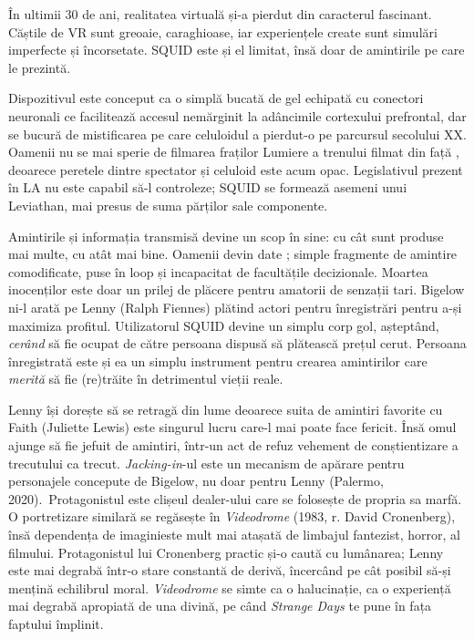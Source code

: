 \documentclass[12pt]{article}
\begin{document}
	În ultimii 30 de ani, realitatea virtuală și-a pierdut din caracterul fascinant. Căștile de VR sunt greoaie, caraghioase, iar experiențele create sunt simulări imperfecte și încorsetate. SQUID este și el limitat, însă doar de amintirile pe care le prezintă.\par
	
	Dispozitivul este conceput ca o simplă bucată de gel echipată cu conectori neuronali ce facilitează accesul nemărginit la adâncimile cortexului prefrontal, dar se bucură de mistificarea pe care celuloidul a pierdut-o pe parcursul secolului XX. Oamenii nu se mai sperie de filmarea fraților Lumiere a trenului filmat din față \parencite{Willistein1995a}, deoarece peretele dintre spectator și celuloid este acum opac. Legislativul prezent în LA nu este capabil să-l controleze; SQUID se formează asemeni unui Leviathan, mai presus de suma părților sale componente.\par
	
	Amintirile și informația transmisă devine un scop în sine: cu cât sunt produse mai multe, cu atât mai bine. Oamenii devin date \parencite{Vishnevetsky2012a}; simple fragmente de amintire comodificate, puse în loop și incapacitat de facultățile decizionale. Moartea inocenților este doar un prilej de plăcere pentru amatorii de senzații tari. Bigelow ni-l arată pe Lenny (Ralph Fiennes) plătind actori pentru înregistrări pentru a-și maximiza profitul. Utilizatorul SQUID devine un simplu corp gol, așteptând, \textit{cerând} să fie ocupat de către persoana dispusă să plătească prețul cerut. Persoana înregistrată este și ea un simplu instrument pentru crearea amintirilor care \textit{merită} să fie (re)trăite în detrimentul vieții reale.\par
	
	Lenny își dorește să se retragă din lume deoarece suita de amintiri favorite cu Faith (Juliette Lewis) este singurul lucru care-l mai poate face fericit. Însă omul ajunge să fie jefuit de amintiri, într-un act de refuz vehement de conștientizare a trecutului ca trecut. \textit{Jacking-in}-ul este un mecanism de apărare pentru personajele concepute de Bigelow, nu doar pentru Lenny (Palermo, 2020). Protagonistul este clișeul dealer-ului care se folosește de propria sa marfă. O portretizare similară se regăsește în \textit{Videodrome} (1983, r. David Cronenberg), însă \dedouble dependența de imagini\sqtworight este mult mai atașată de limbajul fantezist, horror, al filmului. Protagonistul lui Cronenberg practic și-o caută cu lumânarea; Lenny este mai degrabă într-o stare constantă de derivă, încercând pe cât posibil să-și mențină echilibrul moral. \textit{Videodrome} se simte ca o halucinație, ca o experiență mai degrabă apropiată de una divină, pe când \textit{Strange Days} te pune în fața faptului împlinit.\par
	
\end{document}
